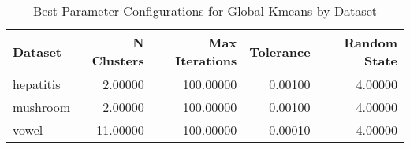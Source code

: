 \begin{table*}[ht!]
\caption{Best Parameter Configurations for Global Kmeans by Dataset}
\label{tab:best_configs_global_kmeans_config}
\begin{tabular}{lrrrr}
Dataset & N Clusters & Max Iterations & Tolerance & Random State \\\midrule

hepatitis & 2.00000 & 100.00000 & 0.00100 & 4.00000 \\
mushroom & 2.00000 & 100.00000 & 0.00100 & 4.00000 \\
vowel & 11.00000 & 100.00000 & 0.00010 & 4.00000 \\
\end{tabular}
\end{table*}
